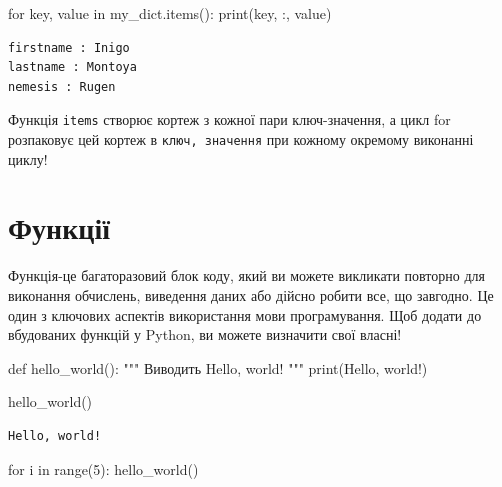 \documentclass[
  letterpaper,
]{report}
\newenvironment{Shaded}{\begin{snugshade}}{\end{snugshade}}
\newcommand{\BuiltInTok}[1]{\textcolor[rgb]{0.00,0.23,0.31}{#1}}
\newcommand{\CommentTok}[1]{\textcolor[rgb]{0.37,0.37,0.37}{#1}}
\newcommand{\ControlFlowTok}[1]{\textcolor[rgb]{0.00,0.23,0.31}{#1}}
\newcommand{\DecValTok}[1]{\textcolor[rgb]{0.68,0.00,0.00}{#1}}
\newcommand{\KeywordTok}[1]{\textcolor[rgb]{0.00,0.23,0.31}{#1}}
\newcommand{\NormalTok}[1]{\textcolor[rgb]{0.00,0.23,0.31}{#1}}
\newcommand{\StringTok}[1]{\textcolor[rgb]{0.13,0.47,0.30}{#1}}
\begin{document}
\begin{Shaded}
\begin{Highlighting}[]
\ControlFlowTok{for}\NormalTok{ key, value }\KeywordTok{in}\NormalTok{ my\_dict.items():}
    \BuiltInTok{print}\NormalTok{(key, }\StringTok{\textquotesingle{}:\textquotesingle{}}\NormalTok{, value)}
\end{Highlighting}
\end{Shaded}

\begin{verbatim}
firstname : Inigo
lastname : Montoya
nemesis : Rugen
\end{verbatim}

Функція \texttt{items} створює кортеж з кожної пари ключ-значення, а
цикл for розпаковує цей кортеж в \texttt{ключ,\ значення} при кожному
окремому виконанні циклу!

\hypertarget{ux444ux443ux43dux43aux446ux456ux457}{%
\section{Функції}\label{ux444ux443ux43dux43aux446ux456ux457}}

Функція-це багаторазовий блок коду, який ви можете викликати повторно
для виконання обчислень, виведення даних або дійсно робити все, що
завгодно. Це один з ключових аспектів використання мови програмування.
Щоб додати до вбудованих функцій у Python, ви можете визначити свої
власні!

\begin{Shaded}
\begin{Highlighting}[]
\KeywordTok{def}\NormalTok{ hello\_world():}
    \CommentTok{""" Виводить Hello, world! """}
    \BuiltInTok{print}\NormalTok{(}\StringTok{\textquotesingle{}Hello, world!\textquotesingle{}}\NormalTok{)}

\NormalTok{hello\_world()}
\end{Highlighting}
\end{Shaded}

\begin{verbatim}
Hello, world!
\end{verbatim}

\begin{Shaded}
\begin{Highlighting}[]
\ControlFlowTok{for}\NormalTok{ i }\KeywordTok{in} \BuiltInTok{range}\NormalTok{(}\DecValTok{5}\NormalTok{):}
\NormalTok{    hello\_world()}
\end{Highlighting}
\end{Shaded}
\end{document}
